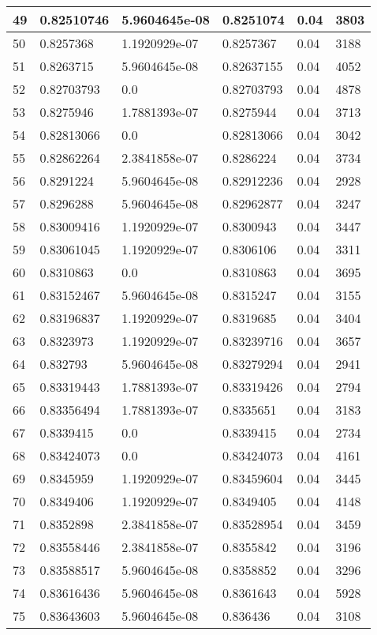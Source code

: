 \begin{longtable}{|l|l|l|l|l|l|}
49 & 0.82510746 & 5.9604645e-08 & 0.8251074 & 0.04 & 3803 \\ \hline 
50 & 0.8257368 & 1.1920929e-07 & 0.8257367 & 0.04 & 3188 \\ \hline 
51 & 0.8263715 & 5.9604645e-08 & 0.82637155 & 0.04 & 4052 \\ \hline 
52 & 0.82703793 & 0.0 & 0.82703793 & 0.04 & 4878 \\ \hline 
53 & 0.8275946 & 1.7881393e-07 & 0.8275944 & 0.04 & 3713 \\ \hline 
54 & 0.82813066 & 0.0 & 0.82813066 & 0.04 & 3042 \\ \hline 
55 & 0.82862264 & 2.3841858e-07 & 0.8286224 & 0.04 & 3734 \\ \hline 
56 & 0.8291224 & 5.9604645e-08 & 0.82912236 & 0.04 & 2928 \\ \hline 
57 & 0.8296288 & 5.9604645e-08 & 0.82962877 & 0.04 & 3247 \\ \hline 
58 & 0.83009416 & 1.1920929e-07 & 0.8300943 & 0.04 & 3447 \\ \hline 
59 & 0.83061045 & 1.1920929e-07 & 0.8306106 & 0.04 & 3311 \\ \hline 
60 & 0.8310863 & 0.0 & 0.8310863 & 0.04 & 3695 \\ \hline 
61 & 0.83152467 & 5.9604645e-08 & 0.8315247 & 0.04 & 3155 \\ \hline 
62 & 0.83196837 & 1.1920929e-07 & 0.8319685 & 0.04 & 3404 \\ \hline 
63 & 0.8323973 & 1.1920929e-07 & 0.83239716 & 0.04 & 3657 \\ \hline 
64 & 0.832793 & 5.9604645e-08 & 0.83279294 & 0.04 & 2941 \\ \hline 
65 & 0.83319443 & 1.7881393e-07 & 0.83319426 & 0.04 & 2794 \\ \hline 
66 & 0.83356494 & 1.7881393e-07 & 0.8335651 & 0.04 & 3183 \\ \hline 
67 & 0.8339415 & 0.0 & 0.8339415 & 0.04 & 2734 \\ \hline 
68 & 0.83424073 & 0.0 & 0.83424073 & 0.04 & 4161 \\ \hline 
69 & 0.8345959 & 1.1920929e-07 & 0.83459604 & 0.04 & 3445 \\ \hline 
70 & 0.8349406 & 1.1920929e-07 & 0.8349405 & 0.04 & 4148 \\ \hline 
71 & 0.8352898 & 2.3841858e-07 & 0.83528954 & 0.04 & 3459 \\ \hline 
72 & 0.83558446 & 2.3841858e-07 & 0.8355842 & 0.04 & 3196 \\ \hline 
73 & 0.83588517 & 5.9604645e-08 & 0.8358852 & 0.04 & 3296 \\ \hline 
74 & 0.83616436 & 5.9604645e-08 & 0.8361643 & 0.04 & 5928 \\ \hline 
75 & 0.83643603 & 5.9604645e-08 & 0.836436 & 0.04 & 3108 \\ \hline 
\end{longtable}